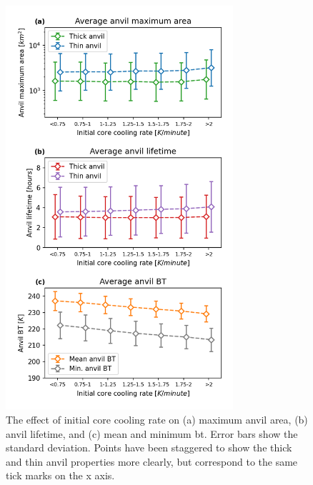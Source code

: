 \begin{figure}[tp]
    \centering
    \includegraphics[width=0.75\textwidth]{figures/chapter3_04.png}
    \caption[
    The effect of initial core cooling rate on maximum anvil area, anvil lifetime, and mean and minimum \acrshort{bt}
    ]{
    The effect of initial core cooling rate on (a) maximum anvil area, (b) anvil lifetime, and (c) mean and minimum \acrshort{bt}. Error bars show the standard deviation. Points have been staggered to show the thick and thin anvil properties more clearly, but correspond to the same tick marks on the x axis.
    }
    \label{fig:anvil_cooling_rate_properties}
\end{figure}

